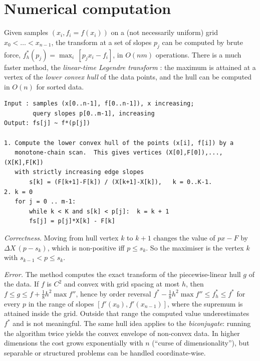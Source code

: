 \documentclass[11pt,a4paper]{article}
\theoremstyle{plain}
\theoremstyle{definition}
\theoremstyle{remark}
\begin{document}
\section{Numerical computation}\label{sec:numerics}

Given samples $(x_i,f_i=f(x_i))$ on a (not necessarily uniform) grid
$x_0<\dots<x_{n-1}$, the transform at a set of slopes $p_j$ can be computed by
brute force, $f^*_h(p_j)=\max_i\,[p_jx_i-f_i]$, in $O(nm)$ operations.  There is
a much faster method, the \emph{linear-time Legendre transform} \cite{Lucet}:
the maximum is attained at a vertex of the \emph{lower convex hull} of the
data points, and the hull can be computed in $O(n)$ for sorted data.

\begin{lstlisting}
Input : samples (x[0..n-1], f[0..n-1]), x increasing;
        query slopes p[0..m-1], increasing
Output: fs[j] ~ f*(p[j])

1. Compute the lower convex hull of the points (x[i], f[i]) by a
   monotone-chain scan.  This gives vertices (X[0],F[0]),...,(X[K],F[K])
   with strictly increasing edge slopes
       s[k] = (F[k+1]-F[k]) / (X[k+1]-X[k]),   k = 0..K-1.
2. k = 0
   for j = 0 .. m-1:
       while k < K and s[k] < p[j]:  k = k + 1
       fs[j] = p[j]*X[k] - F[k]
\end{lstlisting}

\emph{Correctness.}  Moving from hull vertex $k$ to $k+1$ changes the value of
$px-F$ by $\Delta X\,(p-s_k)$, which is non-positive iff $p\le s_k$.  So the
maximiser is the vertex $k$ with $s_{k-1}<p\le s_k$.

\emph{Error.}  The method computes the exact transform of the piecewise-linear
hull $g$ of the data.  If $f$ is $C^2$ and convex with grid spacing at most
$h$, then $f\le g\le f+\tfrac18h^2\max f''$, hence by order reversal
$f^*-\tfrac18h^2\max f''\le f^*_h\le f^*$ for every $p$ in the range of
slopes $[f'(x_0),f'(x_{n-1})]$, where the supremum is attained inside the grid.
Outside that range the computed value underestimates $f^*$ and is not
meaningful.  The same hull idea applies to the \emph{biconjugate}: running the
algorithm twice yields the convex envelope of non-convex data.  In
higher dimensions the cost grows exponentially with $n$ (``curse of
dimensionality''), but separable or structured problems can be handled
coordinate-wise.

\end{document}

